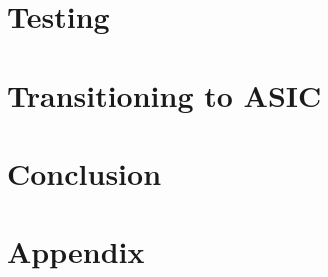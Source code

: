 \documentclass[12pt]{report}
\begin{document}
\chapter{Testing} \label{testing}


\chapter{Transitioning to ASIC} \label{transitioning-to-asic}


\chapter{Conclusion}
 \label{conclusion}

\appendix
\chapter{Appendix}


\printbibliography[heading=bibintoc] \label{bib}
\end{document}
